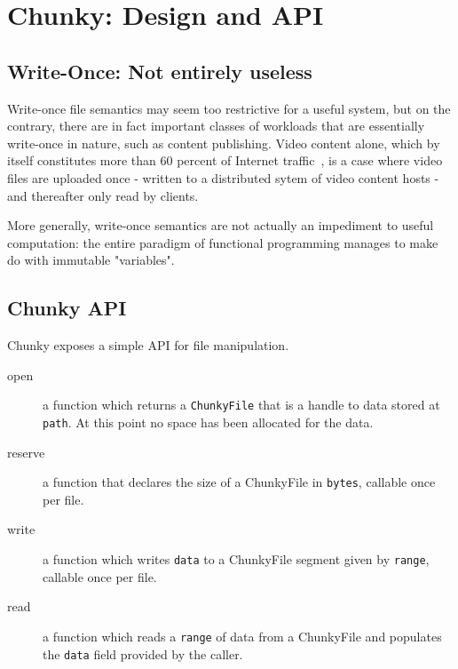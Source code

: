 \documentclass[letterpaper,twocolumn,10pt]{article}
\begin{document}
\section{Chunky: Design and API}
\label{sec:figs}

\subsection{Write-Once: Not entirely useless}

Write-once file semantics may seem too restrictive for a useful system, but on the contrary, there are in fact important classes of workloads that are essentially write-once in nature, such as content publishing. Video content alone, which by itself constitutes more than 60 percent of Internet traffic~\cite{sandvineinternet}, is a case where video files are uploaded once - written to a distributed sytem of video content hosts - and thereafter only read by clients.

More generally, write-once semantics are not actually an impediment to useful computation: the entire paradigm of functional programming manages to make do with immutable "variables".

\subsection{Chunky API}

Chunky exposes a simple API for file manipulation.

\begin{description}
  
\item[open] a function which returns a \texttt{ChunkyFile} that is a handle to data stored at \texttt{path}. At this point no space has been allocated for the data.

\item[reserve] a function that declares the size of a ChunkyFile in \texttt{bytes}, callable once per file.

\item[write] a function which writes \texttt{data} to a ChunkyFile segment given by \texttt{range}, callable once per file.

\item[read] a function which reads a \texttt{range} of data from a ChunkyFile and populates the \texttt{data} field provided by the caller.

\end{description}
\end{document}
